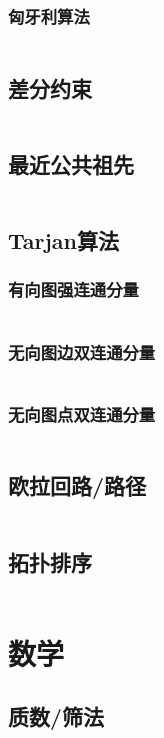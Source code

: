 \documentclass[a4paper,12pt]{article}
\begin{document}
\subsubsection{匈牙利算法} 
\inputminted[breaklines, linenos]{c++}{graph/2graph/xyl.cc}
\subsection{差分约束} %
\inputminted[breaklines, linenos]{c++}{graph/cfys/cfys.cc}
\subsection{最近公共祖先} %
\inputminted[breaklines, linenos]{c++}{graph/lca/lca.cc}
\subsection{Tarjan算法} %
\subsubsection{有向图强连通分量} 
\inputminted[breaklines, linenos]{c++}{graph/tarjan/scc.cc}
\subsubsection{无向图边双连通分量} 
\inputminted[breaklines, linenos]{c++}{graph/tarjan/edcc.cc}
\subsubsection{无向图点双连通分量} 
\inputminted[breaklines, linenos]{c++}{graph/tarjan/vdcc.cc}
\subsection{欧拉回路/路径} %
\inputminted[breaklines, linenos]{c++}{graph/eluer/eluer.cc}
\subsection{拓扑排序} %
\inputminted[breaklines, linenos]{c++}{graph/topsort/top.cc}

\newpage
\section{数学}
\subsection{质数/筛法}
\inputminted[breaklines, linenos]{c++}{math/prime.cc}
\end{document}

